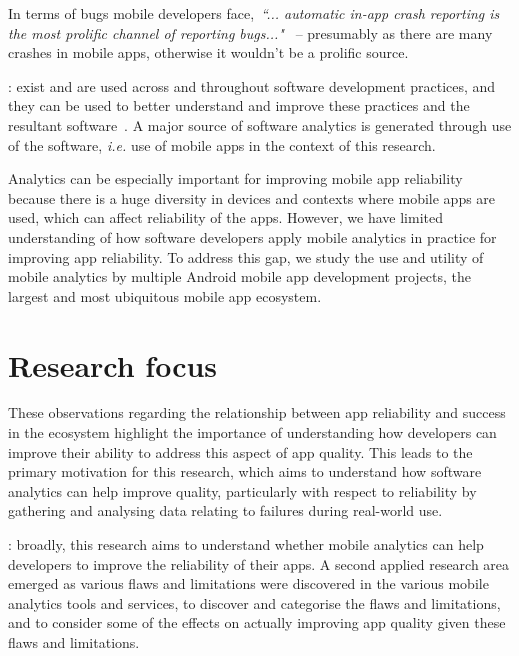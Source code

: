 In terms of bugs mobile developers face,~\emph{``... automatic in-app crash reporting is the most prolific channel of reporting bugs..."}~ %
-- presumably as there are many crashes in mobile apps, otherwise it wouldn't be a prolific source. 


\medskip

: exist and are used across and throughout software development practices, and they can be used to better understand and improve these practices and the resultant software~. A major source of software analytics is generated through use of the software, \emph{i.e.} use of mobile apps in the context of this research.


Analytics can be especially important for improving mobile app reliability because there is a huge diversity in devices and contexts where mobile apps are used, which can affect reliability of the apps. However, we have limited understanding of how software developers apply mobile analytics in practice for improving app reliability. To address this gap, we study the use and utility of mobile analytics by multiple Android mobile app development projects, the largest and most ubiquitous mobile app ecosystem.

\section{Research focus}
These observations regarding the relationship between app reliability and success in the ecosystem highlight the importance of understanding how developers can improve their ability to address this aspect of app quality. This leads to the primary motivation for this research, which aims to understand how software analytics can help improve quality, particularly with respect to reliability by gathering and analysing data relating to failures during real-world use.

: broadly, this research aims to understand whether mobile analytics can help developers to improve the reliability of their apps. A second applied research area emerged as various flaws and limitations were discovered in the various mobile analytics tools and services, to discover and categorise the flaws and limitations, and to consider some of the effects on actually improving app quality given these flaws and limitations.

